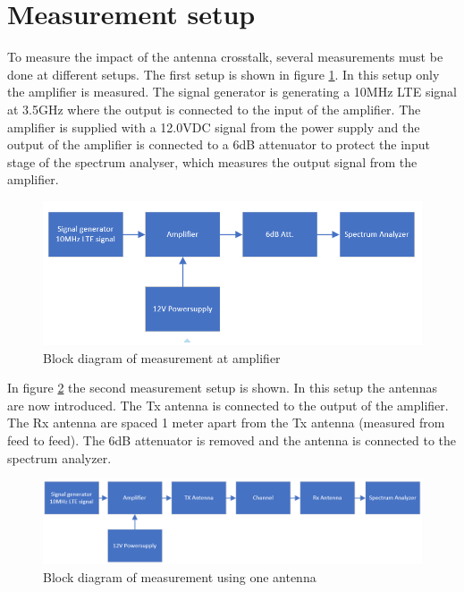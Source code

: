 \section{Measurement setup} \label{ch_meas_setup}
To measure the impact of the antenna crosstalk, several measurements must be done at different setups. The first setup is shown in figure \ref{fig:Meas_setup1}. In this setup only the amplifier is measured. The signal generator is generating a 10MHz LTE signal at 3.5GHz where the output is connected to the input of the amplifier. The amplifier is supplied with a 12.0VDC signal from the power supply and the output of the amplifier is connected to a 6dB attenuator to protect the input stage of the spectrum analyser, which measures the output signal from the amplifier.   

\begin{figure}[H]
\centering 
\includegraphics[scale = 0.6]{figures/measurement/meas_set_1.png}
\caption{Block diagram of measurement at amplifier }
\label{fig:Meas_setup1}
\end{figure} 

In figure \ref{fig:Meas_setup2} the second measurement setup is shown. In this setup the antennas are now introduced. The Tx antenna is connected to the output of the amplifier. The Rx antenna are spaced 1 meter apart from the Tx antenna (measured from feed to feed). The 6dB attenuator is removed and the antenna is connected to the spectrum analyzer. 


\begin{figure}[H]
\centering 
\includegraphics[scale = 0.6]{figures/measurement/meas_set_2.png}
\caption{Block diagram of measurement using one antenna}
\label{fig:Meas_setup2}
\end{figure} 

